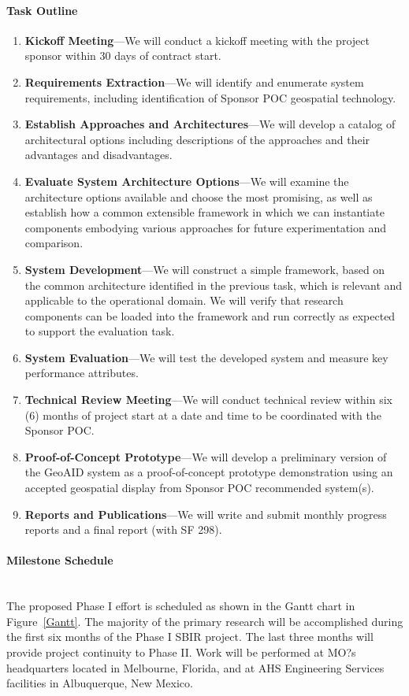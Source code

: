\documentclass{sbir}
\begin{document}
\paragraph{Task Outline} 
\begin{enumerate}
\item {\bf Kickoff Meeting}---We will conduct a kickoff meeting with the project sponsor within 30 days of contract start.
\item {\bf Requirements Extraction}---We will identify and enumerate system requirements, including identification of Sponsor POC geospatial technology.
\item {\bf Establish Approaches and Architectures}---We will develop a catalog of architectural options including descriptions of the approaches and their advantages and disadvantages.
\item {\bf Evaluate System Architecture Options}---We will examine the architecture options available and choose the most promising, as well as establish how a common extensible framework in which we can instantiate components embodying various approaches for future experimentation and comparison.
\item {\bf System Development}---We will construct a simple framework, based on the common architecture identified in the previous task, which is relevant and applicable to the operational domain. We will verify that research components can be loaded into the framework and run correctly as expected to support the evaluation task.
\item {\bf System Evaluation}---We will test the developed system and measure key performance attributes.
\item {\bf Technical Review Meeting}---We will conduct technical review within six (6) months of project start at a date and time to be coordinated with the Sponsor POC.
\item {\bf Proof-of-Concept Prototype}---We will develop a preliminary version of the GeoAID system as a proof-of-concept prototype demonstration using an accepted geospatial display from Sponsor POC recommended system(s).
\item {\bf Reports and Publications}---We will write and submit monthly progress reports and a final report (with SF 298).
\end{enumerate}

\paragraph{Milestone Schedule}~\\
The proposed Phase I effort is scheduled as shown in the Gantt chart in Figure~\ref{Gantt}. The majority of the primary research will be accomplished during the first six months of the Phase I SBIR project. The last three months will provide project continuity to Phase II. Work will be performed at MO?s headquarters located in Melbourne, Florida, and at AHS Engineering Services facilities in Albuquerque, New Mexico.
\end{document}
